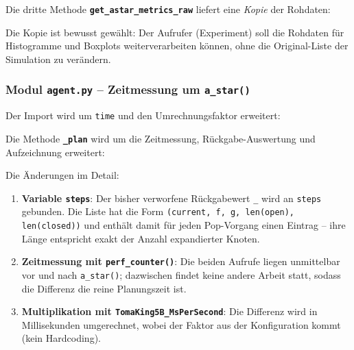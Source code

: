 Die dritte Methode \textbf{\texttt{get\_astar\_metrics\_raw}} liefert eine \textit{Kopie} der Rohdaten:



Die Kopie ist bewusst gewählt: Der Aufrufer (Experiment) soll die Rohdaten für Histogramme und Boxplots weiterverarbeiten können, ohne die Original-Liste der Simulation zu verändern.


\subsubsection{Modul \texttt{agent.py} – Zeitmessung um \texttt{a\_star()}}

Der Import wird um \texttt{time} und den Umrechnungsfaktor erweitert:





Die Methode \textbf{\texttt{\_plan}} wird um die Zeitmessung, Rückgabe-Auswertung und Aufzeichnung erweitert:



Die Änderungen im Detail:

\begin{enumerate}
    \item \textbf{Variable \texttt{steps}}: Der bisher verworfene Rückgabewert \texttt{\_} wird an \texttt{steps} gebunden. Die Liste hat die Form \texttt{(current, f, g, len(open), len(closed))} und enthält damit für jeden Pop-Vorgang einen Eintrag -- ihre Länge entspricht exakt der Anzahl expandierter Knoten.
    \item \textbf{Zeitmessung mit \texttt{perf\_counter()}}: Die beiden Aufrufe liegen unmittelbar vor und nach \texttt{a\_star()}; dazwischen findet keine andere Arbeit statt, sodass die Differenz die reine Planungszeit ist.
    \item \textbf{Multiplikation mit \texttt{TomaKing5B\_MsPerSecond}}: Die Differenz wird in Millisekunden umgerechnet, wobei der Faktor aus der Konfiguration kommt (kein Hardcoding).
\end{enumerate}

